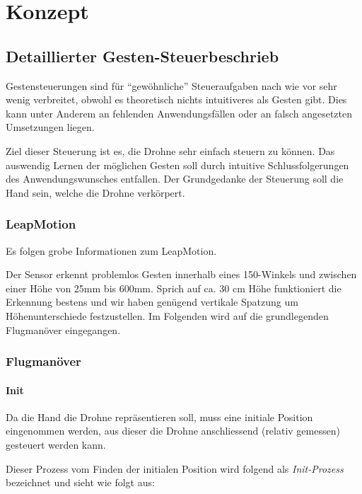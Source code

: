 \chapter{Konzept}

\section{Detaillierter Gesten-Steuerbeschrieb}

Gestensteuerungen sind für "`gewöhnliche"' Steueraufgaben nach wie vor sehr wenig verbreitet, obwohl es theoretisch nichts intuitiveres als Gesten gibt.
Dies kann unter Anderem an fehlenden Anwendungsfällen oder an falsch angesetzten Umsetzungen liegen.

Ziel dieser Steuerung ist es, die Drohne sehr einfach steuern zu können.
Das auswendig Lernen der möglichen Gesten soll durch intuitive Schlussfolgerungen des Anwendungswunsches entfallen.
Der Grundgedanke der Steuerung soll die Hand sein, welche die Drohne verkörpert.

\subsection{LeapMotion}
Es folgen grobe Informationen zum LeapMotion.

Der Sensor erkennt problemlos Gesten innerhalb eines 150\textdegree-Winkels und zwischen einer Höhe von 25mm bis 600mm.
Sprich auf ca. 30 cm Höhe funktioniert die Erkennung bestens und wir haben genügend vertikale Spatzung um Höhenunterschiede festzustellen.
Im Folgenden wird auf die grundlegenden Flugmanöver eingegangen.


\subsection{Flugmanöver}

\subsubsection{Init}

Da die Hand die Drohne repräsentieren soll, muss eine initiale Position eingenommen werden, aus dieser die Drohne anschliessend (relativ gemessen) gesteuert werden kann.

Dieser Prozess vom Finden der initialen Position wird folgend als \textit{Init-Prozess} bezeichnet und sieht wie folgt aus:

